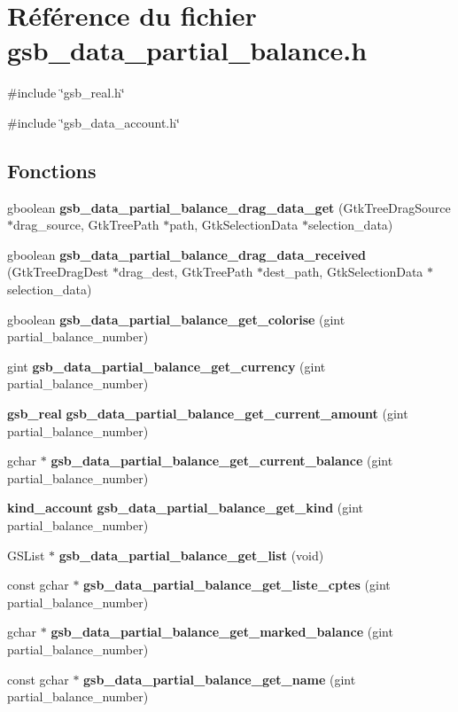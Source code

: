 \section{Référence du fichier gsb\_\-data\_\-partial\_\-balance.h}
\label{gsb__data__partial__balance_8h}
{\ttfamily \#include \char`\"{}gsb\_\-real.h\char`\"{}}\par
{\ttfamily \#include \char`\"{}gsb\_\-data\_\-account.h\char`\"{}}\par
\subsection*{Fonctions}
\begin{DoxyCompactItemize}
\item 
gboolean {\bf gsb\_\-data\_\-partial\_\-balance\_\-drag\_\-data\_\-get} (GtkTreeDragSource $\ast$drag\_\-source, GtkTreePath $\ast$path, GtkSelectionData $\ast$selection\_\-data)
\item 
gboolean {\bf gsb\_\-data\_\-partial\_\-balance\_\-drag\_\-data\_\-received} (GtkTreeDragDest $\ast$drag\_\-dest, GtkTreePath $\ast$dest\_\-path, GtkSelectionData $\ast$selection\_\-data)
\item 
gboolean {\bf gsb\_\-data\_\-partial\_\-balance\_\-get\_\-colorise} (gint partial\_\-balance\_\-number)
\item 
gint {\bf gsb\_\-data\_\-partial\_\-balance\_\-get\_\-currency} (gint partial\_\-balance\_\-number)
\item 
{\bf gsb\_\-real} {\bf gsb\_\-data\_\-partial\_\-balance\_\-get\_\-current\_\-amount} (gint partial\_\-balance\_\-number)
\item 
gchar $\ast$ {\bf gsb\_\-data\_\-partial\_\-balance\_\-get\_\-current\_\-balance} (gint partial\_\-balance\_\-number)
\item 
{\bf kind\_\-account} {\bf gsb\_\-data\_\-partial\_\-balance\_\-get\_\-kind} (gint partial\_\-balance\_\-number)
\item 
GSList $\ast$ {\bf gsb\_\-data\_\-partial\_\-balance\_\-get\_\-list} (void)
\item 
const gchar $\ast$ {\bf gsb\_\-data\_\-partial\_\-balance\_\-get\_\-liste\_\-cptes} (gint partial\_\-balance\_\-number)
\item 
gchar $\ast$ {\bf gsb\_\-data\_\-partial\_\-balance\_\-get\_\-marked\_\-balance} (gint partial\_\-balance\_\-number)
\item 
const gchar $\ast$ {\bf gsb\_\-data\_\-partial\_\-balance\_\-get\_\-name} (gint partial\_\-balance\_\-number)

\end{DoxyCompactItemize}
